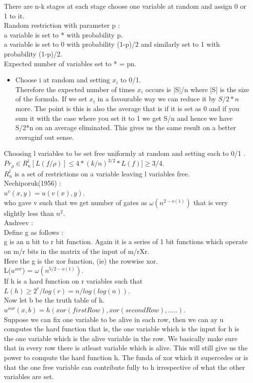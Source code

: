 \documentclass[solution,addpoints,12pt]{exam}
\begin{document}
There are n-k  stages at each stage choose one variable at random and assign
0 or 1 to it.\\
Random restriction with parameter p :\\
a variable is set to * with probability p.\\
a variable is set to 0 with probability (1-p)/2 and similarly set to 1 with
probability (1-p)/2.\\
Expected number of variables set to * = pn.\\
\begin{itemize}
\item Choose i at random and setting $x_i$ to 0/1.\\
Therefore the expected number of times $x_i$ occurs is |S|/n where
|S| is the size of the formula. If we set $x_i$ in a favourable
way we can reduce it by $S/2*n$ more. The point is this is also the average
that is if it is set as 0 and if you sum it with the case where you set it
to 1 we get S/n and hence we have S/2*n on an average eliminated.
This gives us the same result on a better averaginf out sense.
\end{itemize}

Choosing l variables to be set free uniformly at random and setting
each to 0/1 .\\
$Pr_\rho \in R_{n}^{l}[L(f/\rho)] \le 4*(k/n)^{3/2}*L(f)] \ge 3/4$.\\
$R_{n}^{l}$ is a set of restrictions on a variable leaving l variables free.\\
Nechiporuk(1956) :\\
$u^v(x, y) = u(v(x), y)$.\\
who gave v such that we get number of gates as $\omega(n^{2-o(1)})$ that
is very slightly less than $n^2$.\\

Andreev :\\
Define g as follows :\\
g is an n bit to r bit function. Again it is a series
of 1 bit functions which operate on m/r bits in the matrix of the input
of m/rXr.\\
Here the g is the xor function, (ie) the rowwise xor.\\
L($u^{xor}$) = $\omega(n^{5/2 - o(1)})$.\\

If h is a hard function on r variables such that $L(h) \ge 2^r/log(r) = n/log(log(n))$.\\
Now let b be the truth table of h.\\
$u^{xor}(x, b) =  h(xor(firstRow), xor(secondRow), .....)$.\\
Suppose we can fix one variable to be alive in each row, then we can ay u computes
the hard function that is, the one variable which is the input for h is the one
variable which is the alive variable in the row. We basically make sure
that in every row there is atleast variable which is alive. This will still give
us the power to compute the hard function h. The funda of xor which it supercedes
or is that the one free variable can contribute fully to h irrespective
of what the other variables are set.\\
\end{document}
